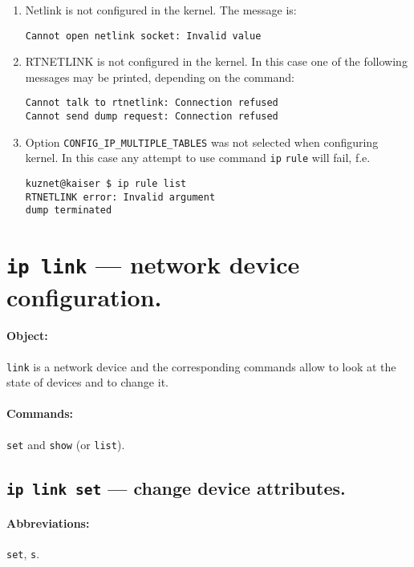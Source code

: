 \begin{enumerate}
\item Netlink is not configured in the kernel. The message is:
\begin{verbatim}
Cannot open netlink socket: Invalid value
\end{verbatim}

\item RTNETLINK is not configured in the kernel. In this case
one of the following messages may be printed, depending on the command:
\begin{verbatim}
Cannot talk to rtnetlink: Connection refused
Cannot send dump request: Connection refused
\end{verbatim}

\item Option \verb|CONFIG_IP_MULTIPLE_TABLES| was not selected
when configuring kernel. In this case any attempt to use command
\verb|ip| \verb|rule| will fail, f.e.
\begin{verbatim}
kuznet@kaiser $ ip rule list
RTNETLINK error: Invalid argument
dump terminated
\end{verbatim}

\end{enumerate}


\section{{\tt ip link} --- network device configuration.}
\label{IP-LINK}

\paragraph{Object:} \verb|link| is a network device and the corresponding
commands allow to look at the state of devices and to change it.

\paragraph{Commands:} \verb|set| and \verb|show| (or \verb|list|).

\subsection{{\tt ip link set} --- change device attributes.}

\paragraph{Abbreviations:} \verb|set|, \verb|s|.


